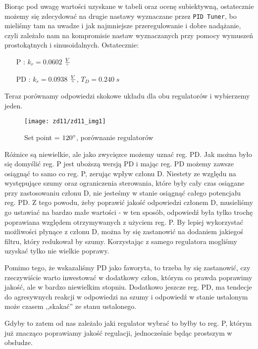 \documentclass[11 pt]{article}
\begin{document}
Biorąc pod uwagę wartości uzyskane w tabeli oraz ocenę subiektywną, ostatecznie możemy się zdecydować na drugie nastawy wyznaczane przez \texttt{PID Tuner}, bo mieliśmy tam na uwadze i jak najmniejsze przeregulowanie i dobre nadążanie, czyli zależało nam na kompromisie nastaw wyznaczanych przy pomocy wymuszeń prostokątnych i sinusoidalnych. Ostatecznie:

\begin{itemize}
\item[P]: $k_r = 0.0602$ $\frac{V}{\degree}$
\item[PD]: $k_r = 0.0938$ $\frac{V}{\degree}$, $T_D = 0.240 \; s$
\end{itemize}

\newpage

Teraz porównamy odpowiedzi skokowe układu dla obu regulatorów i wybierzemy jeden.

\begin{figure}[h!]
	\centerline{
		\texttt{[image: zd11/zd11\_img1]}
	}
	\caption{Set point = $120 \degree$, porównanie regulatorów}
\end{figure}

Różnice są niewielkie, ale jako zwycięzce możemy uznać reg. PD. Jak można było się domyślić reg. P jest uboższą wersją PD i mając reg. PD możemy zawsze osiągnąć to samo co reg. P, zerując wpływ członu D. Niestety ze względu na występujące szumy oraz ograniczenia sterowania, które były cały czas osiągane przy zastosowaniu członu D, nie jesteśmy w stanie osiągnąć całego potencjału reg. PD. Z tego powodu, żeby poprawić jakość odpowiedzi członem D, musieliśmy go ustawiać na bardzo małe wartości - w ten sposób, odpowiedź była tylko trochę poprawiana względem otrzymywanych z użyciem reg. P. By lepiej wykorzystać możliwości płynące z członu D, można by się zastanowić na dodaniem jakiegoś filtru, który redukował by szumy. Korzystając z samego regulatora mogliśmy uzyskać tylko nie wielkie poprawy.

Pomimo tego, że wskazaliśmy PD jako faworyta, to trzeba by się zastanowić, czy rzeczywiście warto inwestować w dodatkowy człon, którym co prawda poprawimy jakość, ale w bardzo niewielkim stopniu. Dodatkowo jeszcze reg. PD, ma tendecje do agresywnych reakcji w odpowiedzi na szumy i odpowiedź w stanie ustalonym może czasem ,,skakać'' ze stanu ustalonego.

Gdyby to zatem od nas zależało jaki regulator wybrać to byłby to reg. P, którym już znacząco poprawiamy jakość regulacji, jednocześnie będąc prostszym w obsłudze.
\end{document}
